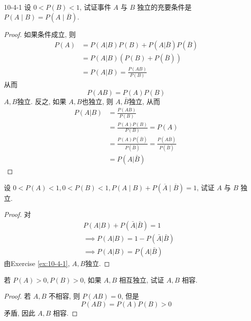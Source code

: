 \documentclass[../main.tex]{subfiles}
\begin{document}
\begin{exercise}{}{10-4-1}
设 $0<P(B)<1$, 试证事件 $A$ 与 $B$ 独立的充要条件是 $P(A \mid B) = P(A \mid \overline{B})$.
\end{exercise}

\begin{proof}
   如果条件成立, 则 \[
    \begin{aligned}
    P\left( A \right)&= P\left( A|B \right)P\left( B \right)+ P\left( A| \overline{B} \right)P\left(  \overline{B} \right)    \\ 
     &= P\left( A|B \right) \left( P\left( B \right)+ P\left(  \overline{B} \right)   \right) \\ 
      &= P\left( A|B \right)= \frac{P\left( AB \right)  }{P\left( B \right)  }  
    \end{aligned}  
    \]从而 \[
    P\left( AB \right)= P\left( A \right)P\left( B \right)   
    \] \(  A,B  \)独立. 反之, 如果 \(  A,B  \)也独立, 则 \(  A, \bar{B}  \)独立, 从而  \[
    \begin{aligned}
    P\left( A|B \right)&= \frac{P\left( AB \right)  }{P\left( B \right)  }\\ 
     &= \frac{P\left( A \right)P\left( B \right)   }{P\left( B \right)  }    = P\left( A \right)\\ 
      &= \frac{P\left( A \right) P\left( \bar{B} \right)  }{P\left( \bar{B} \right)  }  = \frac{P\left( A \bar{B} \right)  }{P\left( \bar{B} \right)  }\\ 
       &= P\left( A|\bar{B} \right)  
    \end{aligned}
    \]  
\end{proof}
\begin{exercise}{}{}
设 $0<P(A)<1, 0<P(B)<1, P(A \mid B) + P(\overline{A} \mid \overline{B}) = 1$, 试证 $A$ 与 $B$ 独立.
\end{exercise}

\begin{proof}
    对 \[
    \begin{aligned}
   & P\left( A|B \right)+ P\left( \bar{A}|\bar{B} \right)= 1   \\ 
    &\implies P\left( A|B \right)= 1-P\left(  \bar{A}|\bar{B} \right)\\ 
     &\implies P\left( A|B \right)   = P\left(  A|\bar{B} \right) 
    \end{aligned}
    \]由Exercise \ref{ex:10-4-1}, \(  A,B  \)独立. 
\end{proof}
\begin{exercise}{}{}
若 $P(A)>0, P(B)>0$, 如果 $A, B$ 相互独立, 试证 $A, B$ 相容.
\end{exercise}
\begin{proof}
    若 \(  A,B  \) 不相容, 则 \(  P\left( AB \right)= 0   \), 但是 \[
    P\left( AB \right)= P\left( A \right)P\left( B \right)> 0   
    \]矛盾, 因此 \(  A,B  \)  相容.
\end{proof}
\end{document}
